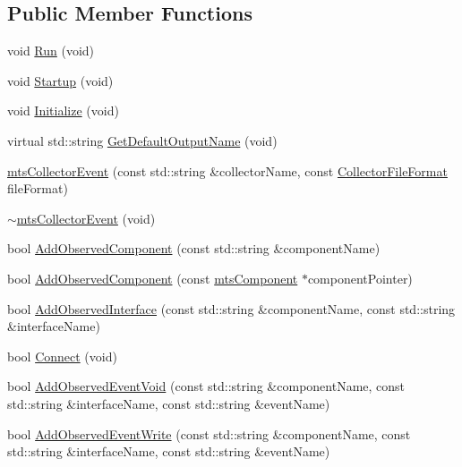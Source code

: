 \subsection*{Public Member Functions}
\begin{DoxyCompactItemize}
\item 
void \hyperlink{classmts_collector_event_a9812847f92aa6d306fefcd900bdb7d8d}{Run} (void)
\item 
void \hyperlink{classmts_collector_event_ab4ce892507f617fe27d1a38201c9e7b6}{Startup} (void)
\item 
void \hyperlink{classmts_collector_event_a92c173290a1a62c5b23b6ffad9ab0169}{Initialize} (void)
\item 
virtual std\+::string \hyperlink{classmts_collector_event_ab6cd1d40c968a7232be60db5e0757ea0}{Get\+Default\+Output\+Name} (void)
\item 
\hyperlink{classmts_collector_event_ade794609539f32f0ab0b44fce130c711}{mts\+Collector\+Event} (const std\+::string \&collector\+Name, const \hyperlink{group__cisst_multi_task_gaa228bed8144053d0bfa316f9ac9d0901}{Collector\+File\+Format} file\+Format)
\item 
\hyperlink{classmts_collector_event_a4e732f97fbe8a6fafc58b3738eb79d79}{$\sim$mts\+Collector\+Event} (void)
\item 
bool \hyperlink{classmts_collector_event_a1c571d23c1c5c3f5fb9d301ec3fd109f}{Add\+Observed\+Component} (const std\+::string \&component\+Name)
\item 
bool \hyperlink{classmts_collector_event_aacb913e2147f9182487eaab381622caa}{Add\+Observed\+Component} (const \hyperlink{classmts_component}{mts\+Component} $\ast$component\+Pointer)
\item 
bool \hyperlink{classmts_collector_event_a9868b47d3a91ce625a4a5e8a0a925d76}{Add\+Observed\+Interface} (const std\+::string \&component\+Name, const std\+::string \&interface\+Name)
\item 
bool \hyperlink{classmts_collector_event_a9e9b47581d6445e5f0c5a71f70afe8e7}{Connect} (void)
\end{DoxyCompactItemize}
{\bf }\par
\begin{DoxyCompactItemize}
\item 
bool \hyperlink{classmts_collector_event_a5f3acacf1512a76a96d6462a05c9a145}{Add\+Observed\+Event\+Void} (const std\+::string \&component\+Name, const std\+::string \&interface\+Name, const std\+::string \&event\+Name)
\item 
bool \hyperlink{classmts_collector_event_a8022da71b4359c86c53bc64d5d443caa}{Add\+Observed\+Event\+Write} (const std\+::string \&component\+Name, const std\+::string \&interface\+Name, const std\+::string \&event\+Name)
\end{DoxyCompactItemize}

